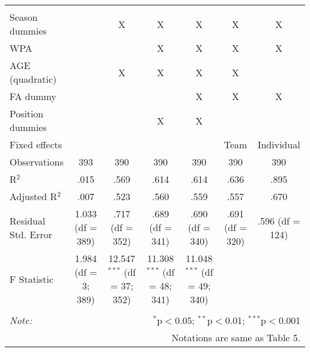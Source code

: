 \begin{table}[H]
\begin{tabular}{@{\extracolsep{5pt}}lcccccc}
  & & & & & & \\
\hline \\[-1.8ex]
Season dummies &  & X & X & X & X & X \\
WPA & & & X & X & X & X  \\
AGE (quadratic) &  & X & X & X & X &  \\
FA dummy &  &  &  & X & X & X \\
Position dummies &  &  & X & X &  &  \\
Fixed effects &  &  &  &  & Team & Individual \\
Observations & 393 & 390 & 390 & 390 & 390 & 390 \\
R$^{2}$ & .015 & .569 & .614 & .614 & .636 & .895 \\
Adjusted R$^{2}$ & .007 & .523 & .560 & .559 & .557 & .670 \\
Residual Std. Error & 1.033 (df = 389) & .717 (df = 352) & .689 (df = 341) & .690 (df = 340) & .691 (df = 320) & .596 (df = 124) \\
F Statistic & 1.984 (df = 3; 389) & 12.547$^{***}$ (df = 37; 352) & 11.308$^{***}$ (df = 48; 341) & 11.048$^{***}$ (df = 49; 340) &  &  \\
\hline
\hline \\[-1.8ex]
\textit{Note:}  & \multicolumn{6}{r}{$^{*}$p$<$0.05; $^{**}$p$<$0.01; $^{***}$p$<$0.001} \\
& \multicolumn{6}{r}{Notations are same as Table 5.} \\
\end{tabular}
\end{table}
